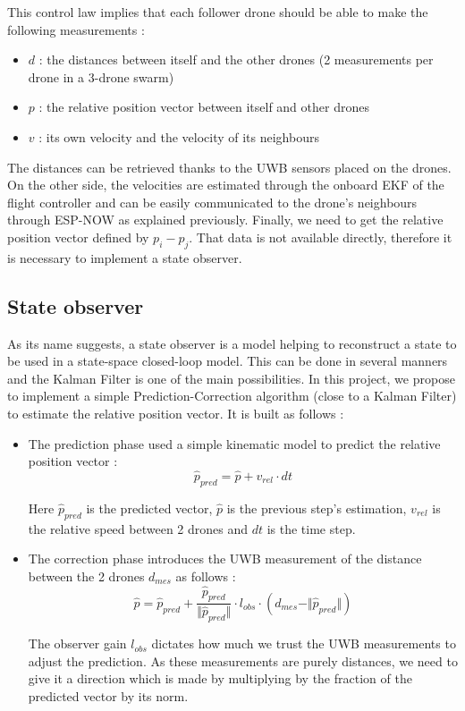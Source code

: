 \documentclass[conference]{IEEEtran}
\begin{document}
This control law implies that each follower drone  should be able to make the following measurements :

\begin{itemize}
    \item $d$ : the distances between itself and the other drones (2 measurements per drone in a 3-drone swarm)
    \item $p$ : the relative position vector between itself and other drones
    \item $v$ : its own velocity and the velocity of its neighbours    
\end{itemize}

The distances can be retrieved thanks to the UWB sensors placed on the drones. On the other side, the velocities are estimated through the onboard EKF of the flight controller and can be easily communicated to the drone's neighbours through ESP-NOW as explained previously. Finally, we need to get the relative position vector defined by $p_i-p_j$. That data is not available directly, therefore it is necessary to implement a state observer.


\subsection{State observer}

As its name suggests, a state observer is a model helping to reconstruct a state to be used in a state-space closed-loop model. This can be done in several manners and the Kalman Filter is one of the main possibilities. In this project, we propose to implement a simple Prediction-Correction algorithm (close to a Kalman Filter) to estimate the relative position vector. It is built as follows :

\begin{itemize}
    \item The prediction phase used a simple kinematic model to predict the relative position vector :
    $$\hat{p}_{pred}=\hat{p}+v_{rel}\cdot dt$$

    Here $\hat{p}_{pred}$ is the predicted vector, $\hat{p}$ is the previous step's estimation, $v_{rel}$ is the relative speed between 2 drones and $dt$ is the time step.

    \item The correction phase introduces the UWB measurement of the distance between the 2 drones $d_{mes}$ as follows : 
    \begin{equation*}
        \hat{p}= \hat{p}_{pred}+\frac{\hat{p}_{pred}}{\Vert \hat{p}_{pred}\Vert} \cdot l_{obs} \cdot (d_{mes}-\Vert \hat{p}_{pred}\Vert)
    \end{equation*}

    The observer gain $l_{obs}$ dictates how much we trust the UWB measurements to adjust the prediction. As these measurements are purely distances, we need to give it a direction which is made by multiplying by the fraction of the predicted vector by its norm. 

\end{itemize}
\end{document}
